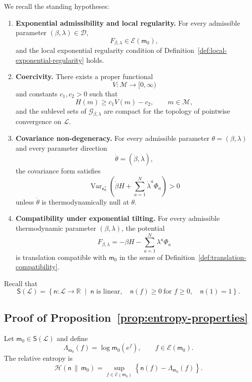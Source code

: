 \documentclass[11pt,reqno]{amsart}
\begin{document}
We recall the standing hypotheses:
\begin{enumerate}[label=(A\arabic*)]
\item \textbf{Exponential admissibility and local regularity.}
For every admissible parameter $(\beta,\lambda)\in\mathcal D$,
\[
F_{\beta,\lambda}\in\mathcal E(\mathsf m_0),
\]
and the local exponential regularity condition of
Definition~\ref{def:local-exponential-regularity} holds.

\item \textbf{Coercivity.}
There exists a proper functional
\[
V\colon\mathcal M\longrightarrow[0,\infty)
\]
and constants $c_1,c_2>0$ such that
\[
H(m)\geq c_1V(m)-c_2,
\qquad
m\in\mathcal M,
\]
and the sublevel sets of $\mathcal G_{\beta,\lambda}$ are compact for
the topology of pointwise convergence on $\mathcal L$.

\item \textbf{Covariance non-degeneracy.}
For every admissible parameter $\theta=(\beta,\lambda)$ and every
parameter direction
\[
\dot\theta=(\dot\beta,\dot\lambda),
\]
the covariance form satisfies
\[
\operatorname{Var}_{\mathsf n_\theta^*}
\left(
\dot\beta H+\sum_{a=1}^{N}\dot\lambda^a\Phi_a
\right)>0
\]
unless $\dot\theta$ is thermodynamically null at $\theta$.

\item \textbf{Compatibility under exponential tilting.}
For every admissible thermodynamic parameter $(\beta,\lambda)$, the
potential
\[
F_{\beta,\lambda}
=
-\beta H-\sum_{a=1}^{N}\lambda^a\Phi_a
\]
is translation compatible with $\mathsf m_0$ in the sense of
Definition~\ref{def:translation-compatibility}.
\end{enumerate}

Recall that
\[
\mathsf S(\mathcal L)
=
\left\{
\mathsf n\colon\mathcal L\to\mathbb R
\;\middle|\;
\mathsf n\text{ is linear},
\quad
\mathsf n(f)\geq 0\ \text{for }f\geq 0,
\quad
\mathsf n(1)=1
\right\}.
\]

\subsection{Proof of Proposition~\ref{prop:entropy-properties}}

Let $\mathsf m_0\in\mathsf S(\mathcal L)$ and define
\[
\Lambda_{\mathsf m_0}(f)
=
\log\mathsf m_0(e^f),
\qquad
f\in\mathcal E(\mathsf m_0).
\]
The relative entropy is
\[
\mathcal H(\mathsf n\,\|\,\mathsf m_0)
=
\sup_{f\in\mathcal E(\mathsf m_0)}
\left\{
\mathsf n(f)-\Lambda_{\mathsf m_0}(f)
\right\}.
\]
\end{document}
